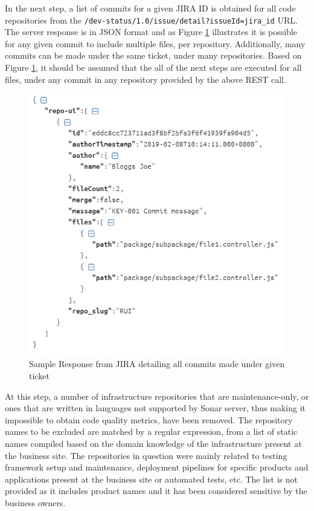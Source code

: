 In the next step, a list of commits for a given JIRA ID is obtained for all code repositories from the \texttt{/dev-status/1.0/issue/detail?issueId={jira_id}} URL. The server response is in JSON format and as Figure \ref{fig:source-code:jira:commit-response} illustrates it is possible for any given commit to include multiple files, per repository. Additionally, many commits can be made under the same ticket, under many repositories. Based on Figure \ref{fig:source-code:jira:commit-response}, it should be assumed that the all of the next steps are executed for all files, under any commit in any repository provided by the above REST call.
\begin{figure}[!h]
    \centering
    \includegraphics[scale=0.7]{Figures/gatherer/jira_connector_getting_commit_files_response.PNG}
    \caption{Sample Response from JIRA detailing all commits made under given ticket}
    \label{fig:source-code:jira:commit-response}
    
\end{figure}
    
At this step, a number of infrastructure repositories that are maintenance-only, or ones that are written in languages not supported by Sonar server, thus making it impossible to obtain code quality metrics, have been removed. The repository names to be excluded are matched by a regular expression, from a list of static names compiled based on the domain knowledge of the infrastructure present at the business site. The repositories in question were mainly related to testing framework setup and maintenance, deployment pipelines for specific products and applications present at the business site or automated tests, etc. The list is not provided as it includes product names and it has been considered sensitive by the business owners.
    
